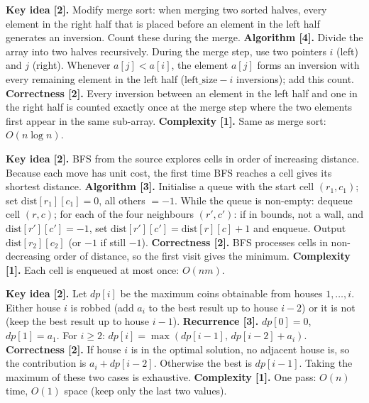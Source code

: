 \begin{solution}
\textbf{Key idea [2].} Modify merge sort: when merging two sorted halves, every element in the right half that is placed before an element in the left half generates an inversion. Count these during the merge.
\textbf{Algorithm [4].} Divide the array into two halves recursively. During the merge step, use two pointers $i$ (left) and $j$ (right). Whenever $a[j] < a[i]$, the element $a[j]$ forms an inversion with every remaining element in the left half ($\text{left\_size} - i$ inversions); add this count.
\textbf{Correctness [2].} Every inversion between an element in the left half and one in the right half is counted exactly once at the merge step where the two elements first appear in the same sub-array.
\textbf{Complexity [1].} Same as merge sort: $O(n \log n)$.
\end{solution}

\begin{solution}
\textbf{Key idea [2].} BFS from the source explores cells in order of increasing distance. Because each move has unit cost, the first time BFS reaches a cell gives its shortest distance.
\textbf{Algorithm [3].} Initialise a queue with the start cell $(r_1, c_1)$; set $\text{dist}[r_1][c_1]=0$, all others $= -1$. While the queue is non-empty: dequeue cell $(r,c)$; for each of the four neighbours $(r',c')$: if in bounds, not a wall, and $\text{dist}[r'][c'] = -1$, set $\text{dist}[r'][c'] = \text{dist}[r][c]+1$ and enqueue. Output $\text{dist}[r_2][c_2]$ (or $-1$ if still $-1$).
\textbf{Correctness [2].} BFS processes cells in non-decreasing order of distance, so the first visit gives the minimum.
\textbf{Complexity [1].} Each cell is enqueued at most once: $O(nm)$.
\end{solution}

\begin{solution}
\textbf{Key idea [2].} Let $dp[i]$ be the maximum coins obtainable from houses $1, \ldots, i$. Either house $i$ is robbed (add $a_i$ to the best result up to house $i-2$) or it is not (keep the best result up to house $i-1$).
\textbf{Recurrence [3].} $dp[0]=0$, $dp[1]=a_1$. For $i \ge 2$: $dp[i] = \max(dp[i-1],\, dp[i-2] + a_i)$.
\textbf{Correctness [2].} If house $i$ is in the optimal solution, no adjacent house is, so the contribution is $a_i + dp[i-2]$. Otherwise the best is $dp[i-1]$. Taking the maximum of these two cases is exhaustive.
\textbf{Complexity [1].} One pass: $O(n)$ time, $O(1)$ space (keep only the last two values).
\end{solution}
\fi


